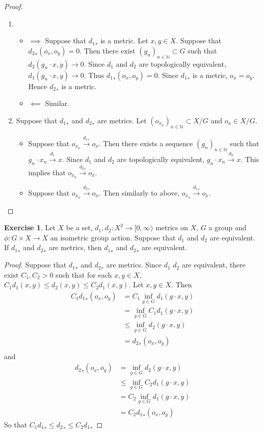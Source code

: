\documentclass[12pt]{amsart}
\theoremstyle{definition}
\newtheorem{ex}[definition]{Exercise}
\newcommand{\N}{\mathbb{N}}
\newcommand{\Rg}{[0,\infty)}
\newcommand{\conv}[1]{\xrightarrow{#1}}
\begin{document}
	\begin{proof}\
	\begin{enumerate}
	\item 
	\begin{itemize}
	\item $\implies$ Suppose that ${d_1}_*$ is a metric. Let $x,y \in X$. Suppose that ${d_2}_*(o_x, o_y) = 0$. Then there exist $(g_n)_{n \in \N} \subset G$ such that $d_2(g_n \cdot x, y) \rightarrow 0$. Since $d_1$ and $d_2$ are topologically equivalent, $d_1(g_n \cdot x, y) \rightarrow 0$. Thus ${d_1}_*(o_x, o_y) = 0$. Since ${d_1}_*$ is a metric, $o_x = o_y$. Hence ${d_2}_*$ is a metric. 
	\item $\impliedby$ Similar.
	\end{itemize}
	\item Suppose that ${d_1}_*$ and ${d_2}_*$ are metrics. Let $(o_{x_n})_{n \in \N} \subset X/G$ and $o_x \in X/G$. 
	\begin{itemize}
	\item Suppose that $o_{x_n} \conv{{d_1}_*} o_x$. Then there exists a sequence $(g_n)_{n \in \N}$ such that $g_n \cdot x_n \conv{d_1} x$. Since $d_1$ and $d_2$ are topologically equivalent, $g_n \cdot x_n \conv{d_2} x$. This implies that $o_{x_n} \conv{{d_2}_*} o_x$. 
	\item Suppose that $o_{x_n} \conv{{d_2}_*} o_x$. Then similarly to above, $o_{x_n} \conv{{d_1}_*} o_x$.
	\end{itemize}
	\end{enumerate}
	\end{proof}	
	
	\begin{ex}
	Let $X$ be a set, $d_1, d_2: X^2 \rightarrow \Rg$ metrics on $X$, $G$ a group and $\phi: G \times X \rightarrow X$ an isometric group action. Suppose that $d_1$ and $d_2$ are equivalent. If ${d_1}_*$ and ${d_2}_*$ are metrics, then ${d_1}_*$ and ${d_2}_*$ are equivalent.
	\end{ex}
	
	\begin{proof} Suppose that ${d_1}_*$ and ${d_2}_*$  are metrics. Since $d_1$ $d_2$ are equivalent, there exist $C_1, C_2 >0$ such that for each $x,y \in X$, $C_1d_1(x,y) \leq d_2(x,y) \leq C_2d_1(x,y)$. Let $x,y \in X$. Then
	\begin{align*}
	C_1{d_1}_*(o_x, o_y) 
	&= C_1 \inf_{g \in G} d_1(g \cdot x, y) \\
	&=  \inf_{g \in G} C_1 d_1(g \cdot x, y) \\
	&\leq \inf_{g \in G} d_2(g \cdot x, y) \\
	&= {d_2}_*(o_x, o_y) \\
	\end{align*}	 
	and 
	\begin{align*}
	{d_2}_*(o_x, o_y) 
	&= \inf_{g \in G} d_2(g \cdot x, y) \\	
	& \leq \inf_{g \in G} C_2 d_1(g \cdot x, y) \\
	&= C_2 \inf_{g \in G}  d_1(g \cdot x, y) \\
	&= C_2 {d_1}_*(o_x, o_y)
	\end{align*}
	So that $C_1 {d_1}_* \leq {d_2}_* \leq C_2 {d_1}_*$
	\end{proof}
\end{document}

